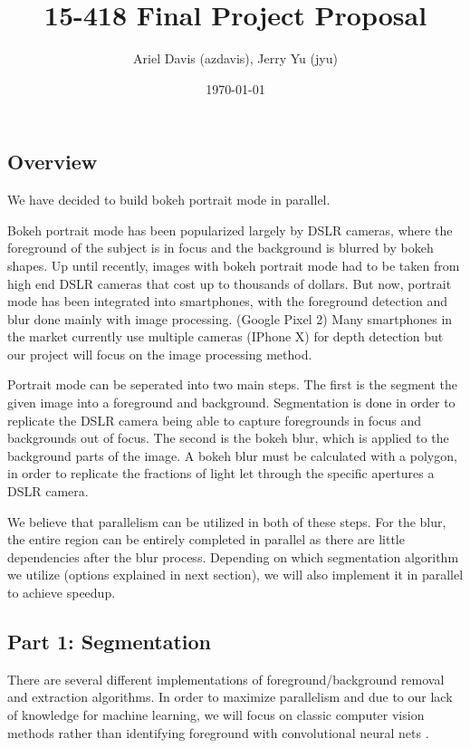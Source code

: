 \documentclass[12pt]{article}
\author{Ariel Davis (azdavis), Jerry Yu (jyu)}
\date{\today}
\title{15-418 Final Project Proposal}
\begin{document}
\maketitle

\subsection*{Overview}
We have decided to build bokeh portrait mode in parallel.

Bokeh portrait mode has been popularized largely by DSLR cameras, where the
foreground of the subject is in focus and the background is blurred by bokeh
shapes. Up until recently, images with bokeh portrait mode had to be taken
from high end DSLR cameras that cost up to thousands of dollars. But now,
portrait mode has been integrated into smartphones, with the foreground
detection and blur done mainly with image processing. (Google Pixel 2) Many
smartphones in the market currently use multiple cameras (IPhone X) for
depth detection but our project will focus on the image processing method.

Portrait mode can be seperated into two main steps. The first is the segment
the given image into a foreground and background. Segmentation is done in order
to replicate the DSLR camera being able to capture foregrounds in focus and
backgrounds out of focus.
The second is the bokeh blur, which is applied to the background parts of the
image. A bokeh blur must be calculated with a polygon, in order to replicate the
fractions of light let through the specific apertures a DSLR camera.

We believe that parallelism can be utilized in both of these steps. For the
blur, the entire region can be entirely completed in parallel as there are
little dependencies after the blur process. Depending on which segmentation
algorithm we utilize (options explained in next section), we will also
implement it in parallel to achieve speedup.

\subsection*{Part 1: Segmentation}
There are several different implementations of foreground/background removal
and extraction algorithms. In order to maximize parallelism and due to our lack
of knowledge for machine learning, we will focus on classic computer vision
methods rather than identifying foreground with convolutional neural nets
\cite{pixel-ml}.
\end{document}

